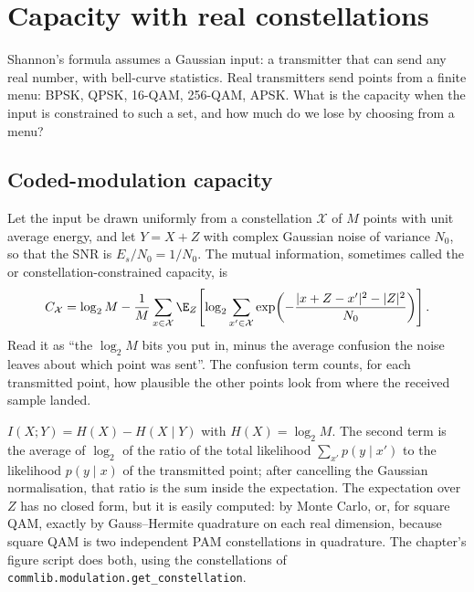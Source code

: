 \section{Capacity with real constellations}
\label{sec:ch13:constrained}

Shannon's formula assumes a Gaussian input: a transmitter that can send any real number, with
bell-curve statistics. Real transmitters send points from a finite menu: BPSK, QPSK, 16-QAM,
256-QAM, APSK. What is the capacity when the input is constrained to such a set, and how much do
we lose by choosing from a menu?


\subsection{Coded-modulation capacity}

Let the input be drawn uniformly from a constellation $\mathcal{X}$ of $M$ points with unit average
energy, and let $Y=X+Z$ with complex Gaussian noise of variance $N_0$, so that the SNR is
$E_s/N_0=1/N_0$. The mutual information, sometimes called the  or
constellation-constrained capacity, is
\begin{equation}
C_{\mathcal{X}}=\log_2M-\frac1M\sum_{x\in\mathcal{X}}\E_Z\!\left[\log_2\sum_{x'\in\mathcal{X}}
\exp\!\left(-\frac{|x+Z-x'|^2-|Z|^2}{N_0}\right)\right].
\label{eq:ch13:cm}
\end{equation}
Read it as ``the $\log_2M$ bits you put in, minus the average confusion the noise leaves about
which point was sent''. The confusion term counts, for each transmitted point, how plausible the
other points look from where the received sample landed.

\begin{deeper}
$I(X;Y)=H(X)-H(X\mid Y)$ with $H(X)=\log_2M$. The second term is the average of $\log_2$ of the
ratio of the total likelihood $\sum_{x'}p(y\mid x')$ to the likelihood $p(y\mid x)$ of the
transmitted point; after cancelling the Gaussian normalisation, that ratio is the sum inside the
expectation. The expectation over $Z$ has no closed form, but it is easily computed: by Monte
Carlo, or, for square QAM, exactly by Gauss--Hermite quadrature on each real dimension, because
square QAM is two independent PAM constellations in quadrature. The chapter's figure script does
both, using the constellations of \texttt{commlib.modulation.get\_constellation}.
\end{deeper}

